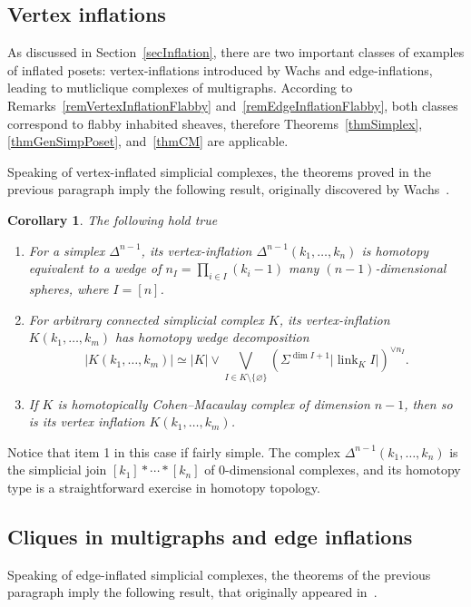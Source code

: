 \documentclass[english,12pt,oneside]{amsproc}
\DeclareMathOperator{\link}{link}
\newcounter{stmcounter}[section]
\numberwithin{equation}{section}
\theoremstyle{plain}
\newtheorem{cor}[stmcounter]{Corollary}
\theoremstyle{definition}
\theoremstyle{remark}
\begin{document}
\subsection{Vertex inflations}
As discussed in Section~\ref{secInflation}, there are two important classes of examples of inflated posets: vertex-inflations introduced by Wachs and edge-inflations, leading to mutliclique complexes of multigraphs. According to Remarks~\ref{remVertexInflationFlabby} and~\ref{remEdgeInflationFlabby}, both classes correspond to flabby inhabited sheaves, therefore Theorems~\ref{thmSimplex}, \ref{thmGenSimpPoset}, and~\ref{thmCM} are applicable.

Speaking of vertex-inflated simplicial complexes, the theorems proved in the previous paragraph imply the following result, originally discovered by Wachs~\cite{Wachs}.

\begin{cor}
The following hold true
\begin{enumerate}
  \item For a simplex $\Delta^{n-1}$, its vertex-inflation $\Delta^{n-1}(k_1,\ldots,k_n)$ is homotopy equivalent to a wedge of $n_I=\prod_{i\in I}(k_i-1)$ many $(n-1)$-dimensional spheres, where $I=[n]$.
  \item For arbitrary connected simplicial complex $K$, its vertex-inflation $K(k_1,\ldots,k_m)$ has homotopy wedge decomposition
  \[
  |K(k_1,\ldots,k_m)|\simeq |K|\vee \bigvee_{I\in K\setminus\{\varnothing\}} (\Sigma^{\dim I+1}|\link_KI|)^{\vee n_I}.
  \]
  \item If $K$ is homotopically Cohen--Macaulay complex of dimension $n-1$, then so is its vertex inflation $K(k_1,\ldots,k_m)$.
\end{enumerate}
\end{cor}

Notice that item 1 in this case if fairly simple. The complex $\Delta^{n-1}(k_1,\ldots,k_n)$ is the simplicial join $[k_1]\ast\cdots\ast[k_n]$ of 0-dimensional complexes, and its homotopy type is a straightforward exercise in homotopy topology.

\subsection{Cliques in multigraphs and edge inflations}
Speaking of edge-inflated simplicial complexes, the theorems of the previous paragraph imply the following result, that originally appeared in~\cite{AyzRukh}.
\end{document}
